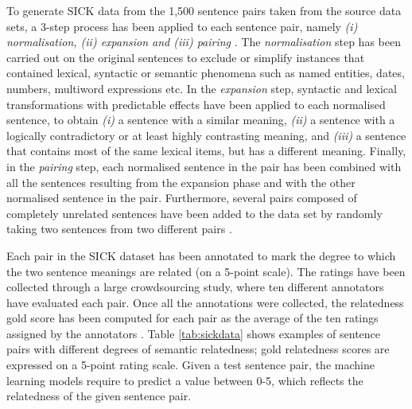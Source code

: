 \begin{enumerate}
  To generate SICK data from the 1,500 sentence pairs taken from the source data sets, a 3-step process has been applied to each sentence pair, namely \textit{(i) normalisation, (ii) expansion and (iii) pairing} \autocite{marelli-etal-2014-semeval}. The \textit{normalisation} step has been carried out on the original sentences to exclude or simplify instances that contained lexical, syntactic or semantic phenomena such as named entities, dates, numbers, multiword expressions etc. In the \textit{expansion} step, syntactic and lexical transformations with predictable effects have been applied to each normalised sentence, to obtain \textit{(i)} a sentence with a similar meaning, \textit{(ii)} a sentence with a logically contradictory or at least highly contrasting meaning, and \textit{(iii)} a sentence that contains most of the same lexical items, but has a different meaning. Finally, in the \textit{pairing} step, each normalised sentence in the pair has been combined with all the sentences resulting from the expansion phase and with the other normalised sentence in the pair. Furthermore, several pairs composed of completely unrelated sentences have been added to the data set by randomly taking two sentences from two different pairs \autocite{marelli-etal-2014-semeval}. 
  
  Each pair in the SICK dataset has been annotated to mark the degree to which the two sentence meanings are related (on a 5-point scale). The ratings have been collected through a large crowdsourcing study, where ten different annotators have evaluated each pair. Once all the annotations were collected, the relatedness gold score has been computed for each pair as the average of the ten ratings assigned by the annotators \autocite{marelli-etal-2014-semeval}. Table \ref{tab:sickdata} shows examples of sentence pairs with different degrees of semantic relatedness; gold relatedness scores are expressed on a 5-point rating scale. Given a test sentence pair, the machine learning models require to predict a value between 0-5, which reflects the relatedness of the given sentence pair. 
  

\end{enumerate}
